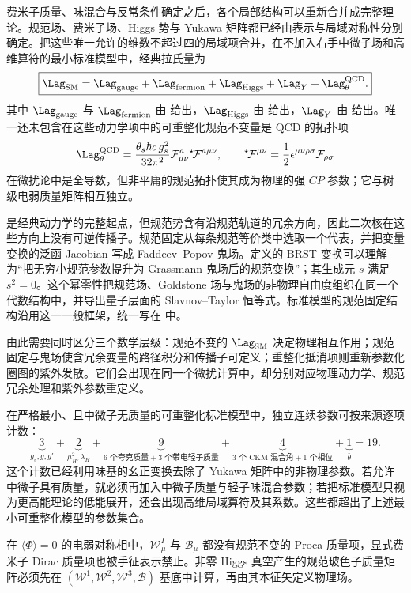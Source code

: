 费米子质量、味混合与反常条件确定之后，各个局部结构可以重新合并成完整理论。规范场、费米子场、Higgs 势与 Yukawa 矩阵都已经由表示与局域对称性分别确定。把这些唯一允许的维数不超过四的局域项合并，在不加入右手中微子场和高维算符的最小标准模型中，经典拉氏量为
\begin{equation}
 \boxed{
 \Lag_{\rm SM}
 =\Lag_{\rm gauge}
 +\Lag_{\rm fermion}
 +\Lag_{\rm Higgs}
 +\Lag_Y
 +\Lag_{\theta}^{\rm QCD}.}
 \label{eq:sm-full-lagrangian-blocks-dp11}
\end{equation}
其中 $\Lag_{\rm gauge}$ 与 $\Lag_{\rm fermion}$ 由  给出，$\Lag_{\rm Higgs}$ 由  给出，$\Lag_Y$ 由  给出。唯一还未包含在这些动力学项中的可重整化规范不变量是 QCD 的拓扑项
\begin{equation}
 \Lag_{\theta}^{\rm QCD}
 =\frac{\theta_s\hbar c\,g_s^2}{32\pi^2}
 \mathcal F_{\mu\nu}^a{}^\star\!\mathcal F^{a\mu\nu},
 \qquad
 {}^\star\!\mathcal F^{\mu\nu}
 =\frac12\epsilon^{\mu\nu\rho\sigma}\mathcal F_{\rho\sigma}
 \label{eq:qcd-theta-term-sm-dp11}
\end{equation}
在微扰论中是全导数，但非平庸的规范拓扑使其成为物理的强 $CP$ 参数；它与树级电弱质量矩阵相互独立。

 是经典动力学的完整起点，但规范势含有沿规范轨道的冗余方向，因此二次核在这些方向上没有可逆传播子。规范固定从每条规范等价类中选取一个代表，并把变量变换的泛函 Jacobian 写成 Faddeev--Popov 鬼场。定义的 BRST 变换可以理解为“把无穷小规范参数提升为 Grassmann 鬼场后的规范变换”；其生成元 $s$ 满足 $s^2=0$。这个幂零性把规范场、Goldstone 场与鬼场的非物理自由度组织在同一个代数结构中，并导出量子层面的 Slavnov--Taylor 恒等式。标准模型的规范固定结构沿用这一一般框架，统一写在 中。

由此需要同时区分三个数学层级：规范不变的 $\Lag_{\rm SM}$ 决定物理相互作用；规范固定与鬼场使含冗余变量的路径积分和传播子可定义；重整化抵消项则重新参数化圈图的紫外发散。它们会出现在同一个微扰计算中，却分别对应物理动力学、规范冗余处理和紫外参数重定义。


\begin{proposition}[最小可重整化标准模型的参数集合]
在严格最小、且中微子无质量的可重整化标准模型中，独立连续参数可按来源逐项计数：
\begin{equation}
 \underbrace{3}_{g_s,g,g'}
 +\underbrace{2}_{\mu_H^2,\lambda_H}
 +\underbrace{9}_{6\text{ 个夸克质量}+3\text{ 个带电轻子质量}}
 +\underbrace{4}_{3\text{ 个 CKM 混合角}+1\text{ 个相位}}
 +\underbrace{1}_{\bar\theta}
 =\boxed{19}.
 \label{eq:minimal-sm-parameter-count-dp11}
\end{equation}
这个计数已经利用味基的幺正变换去除了 Yukawa 矩阵中的非物理参数。若允许中微子具有质量，就必须再加入中微子质量与轻子味混合参数；若把标准模型只视为更高能理论的低能展开，还会出现高维局域算符及其系数。这些都超出了上述最小可重整化模型的参数集合。
\end{proposition}



在 $\langle\Phi\rangle=0$ 的电弱对称相中，$\mathcal W_\mu^I$ 与 $\mathcal B_\mu$ 都没有规范不变的 Proca 质量项，显式费米子 Dirac 质量项也被手征表示禁止。非零 Higgs 真空产生的规范玻色子质量矩阵必须先在 $(\mathcal W^1,\mathcal W^2,\mathcal W^3,\mathcal B)$ 基底中计算，再由其本征矢定义物理场。



